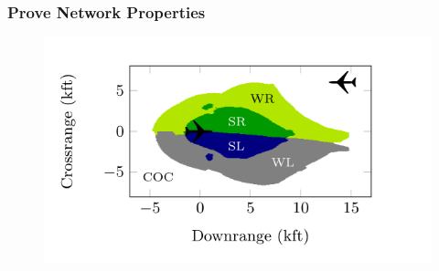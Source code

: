 \documentclass[aspectratio=169%
,serif,mathserif]{beamer}
\begin{document}
\begin{frame}
	\frametitle{Prove Network Properties}
	\begin{figure}
		\includegraphics[width=0.75\linewidth]{13.png}
	\end{figure}

\end{frame}






\begin{frame}
\hfill
{}
\linespread{3}\selectfont
\end{frame}
\end{document}
